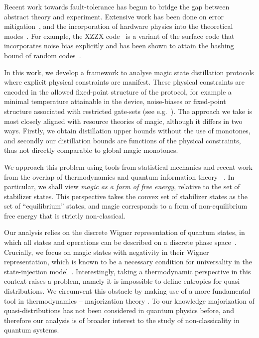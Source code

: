 \documentclass[pra,
aps,
twocolumn,
superscriptaddress,
groupedaddress,
nofootinbib,
reprint
]{revtex4-1}
\begin{document}
  
Recent work towards fault-tolerance has begun to bridge the gap between abstract theory and experiment. Extensive work has been done on error mitigation~\cite{Li_2017, Temme_2017, Endo_2018, McClean_2017}, and the incorporation of hardware physics into the theoretical modes~\cite{Kandala_2019, Colless_2018, song2018quantum, Bravyi_2021}. For example, the XZZX code~\cite{bonilla_ataides_xzzx_2021} is a variant of the surface code that incorporates noise bias explicitly and has been shown to attain the hashing bound of random codes~\cite{Bennett_1996}. 

In this work, we develop a framework to analyse magic state distillation protocols where explicit physical constraints are manifest. These physical constraints are encoded in the allowed fixed-point structure of the protocol, for example a minimal temperature attainable in the device, noise-biases or fixed-point structure associated with restricted gate-sets (see e.g.~\cite{Aliferis_2008, Stephens_2013, Li_2015, Babbush_2018, Tuckett_2019, Guillaud_2019, Fowler_2019}). The approach we take is most closely aligned with resource theories of magic, although it differs in two ways. Firstly, we obtain distillation upper bounds without the use of monotones, and secondly our distillation bounds are functions of the physical constraints, thus not directly comparable to global magic monotones.

We approach this problem using tools from statistical mechanics and recent work from the overlap of thermodynamics and quantum information theory~\cite{cit:gour, cit:gour2} . In particular, we shall view \emph{magic as a form of free energy}, relative to the set of stabilizer states. This perspective takes the convex set of stabilizer states as the set of ``equilibrium'' states, and magic corresponds to a form of non-equilibrium free energy that is strictly non-classical.

Our analysis relies on the discrete Wigner representation of quantum states, in which all states and operations can be described on a discrete phase space~\cite{Ferrie_2008, Okay_2021}. Crucially, we focus on magic states with negativity in their Wigner representation, which is known to be a necessary condition for universality in the state-injection model~\cite{cit:veitch, cit:mari, cit:gottesman, cit:knill, Campbell_2011}. Interestingly, taking a thermodynamic perspective in this context raises a problem, namely it is impossible to define entropies for quasi-distributions. We circumvent this obstacle by making use of a more fundamental tool in thermodynamics -- majorization theory \ddd{[cite]}. To our knowledge majorization of quasi-distributions has not been considered in quantum physics before, and therefore our analysis is of broader interest to the study of non-classicality in quantum systems.
\end{document}
